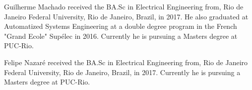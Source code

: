 \documentclass[a4paper]{IEEEtran}
\begin{document}
\begin{IEEEbiographynophoto}{Guilherme Machado}
received the BA.Sc in Electrical Engineering from, Rio de Janeiro Federal University, Rio de Janeiro, Brazil, in 2017. He also graduated at Automatized Systems Engineering at a double degree program in the French "Grand Ecole" Supélec in 2016. Currently he is pursuing a Masters degree at PUC-Rio.
\end{IEEEbiographynophoto}


\begin{IEEEbiographynophoto}{Felipe Nazaré}
received the BA.Sc in Electrical Engineering from, Rio de Janeiro Federal University, Rio de Janeiro, Brazil, in 2017. Currently he is pursuing a Masters degree at PUC-Rio.
\end{IEEEbiographynophoto}






\end{document}
